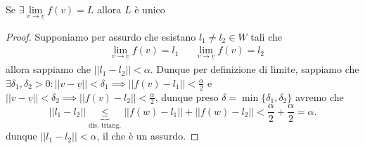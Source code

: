 \documentclass[12pt, twoside, italian, openany]{book}
\begin{document}
	\begin{prop}
		Se $\exists \lim\limits_{v \to \underline{v}} f(v) = L$ allora $L$ è unico 
	\end{prop}
	\begin{proof}
		Supponiamo per assurdo che esistano $l_1 \neq l_2 \in W$ tali che
		\begin{align*}
			&\lim_{v \to \underline{v}} f(v) = l_1 & &\lim_{v \to \underline{v}} f(v) = l_2
		\end{align*}
		allora sappiamo che $|| l_1 - l_2|| < \alpha$. Dunque per definizione di limite, sappiamo che $\exists \delta_1, \delta_2 > 0: || v - \underline{v} || < \delta_1 \implies ||f(v) - l_1 || < \frac{\alpha}{2}$ e $||v - \underline{v} || < \delta_2 \implies ||f(v) - l_2|| < \frac{\alpha}{2}$, dunque preso $\delta = \min\{ \delta_1, \delta_2 \}$ avremo che  
		$$
		|| l_1 - l_2 || \underbrace{\leq}_{\text{dis. triang.}} || f(w) - l_1 || + || f(w) - l_2 || <  \frac{\alpha}{2} + \frac{\alpha}{2} = \alpha.
		$$
		dunque $|| l_1 - l_2 || < \alpha$, il che è un assurdo.
	\end{proof}
\end{document}
